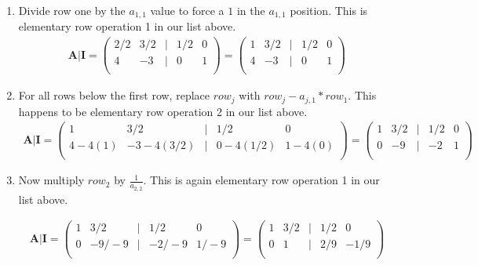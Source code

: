 \begin{enumerate}
\item Divide row one by the $a_{1,1}$ value to force a $1$ in the $a_{1,1}$ position.   This is elementary row operation 1 in our list above.
\begin{gather}
\mathbf{A} | \mathbf{I} =
\begin{pmatrix}
2/2 & 3/2 & | & 1/2 & 0 \\
4 & -3 & | & 0 & 1 \\
\end{pmatrix}
=
\begin{pmatrix}
1 & 3/2 & | & 1/2 & 0 \\
4 & -3 & | & 0 & 1 \\
\end{pmatrix}
\end{gather}

\item For all rows below the first row, replace $row_j$ with $row_j - a_{j,1}*row_1$.  
This happens to be elementary row operation 2 in our list above.
\begin{gather}
\mathbf{A} | \mathbf{I} =
\begin{pmatrix}
1 & 3/2 & | & 1/2 & 0 \\
4 - 4(1) & -3 - 4(3/2) & | & 0-4(1/2) & 1-4(0) \\
\end{pmatrix}
=
\begin{pmatrix}
1 & 3/2 & | & 1/2 & 0 \\
0 & -9 & | & -2 & 1 \\
\end{pmatrix}
\end{gather}


\item Now multiply $row_2$ by $ \frac{1}{ a_{2,2}} $.  This is again elementary row operation 1 in our list above.

\begin{gather}
\mathbf{A} | \mathbf{I} =
\begin{pmatrix}
1 & 3/2 & | & 1/2 & 0 \\
0 & -9/-9 & | & -2/-9 & 1/-9 \\
\end{pmatrix}
=
\begin{pmatrix}
1 & 3/2 & | & 1/2 & 0 \\
0 & 1 & | & 2/9 & -1/9 \\
\end{pmatrix}
\end{gather}


\end{enumerate}
